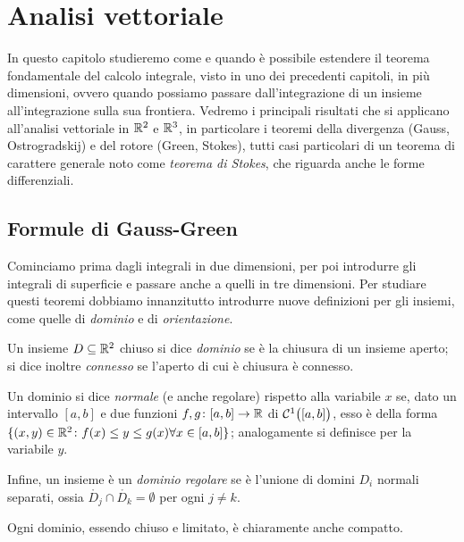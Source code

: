 \chapter{Analisi vettoriale}
In questo capitolo studieremo come e quando è possibile estendere il teorema fondamentale del calcolo integrale, visto in uno dei precedenti capitoli, in più dimensioni, ovvero quando possiamo passare dall'integrazione di un insieme all'integrazione sulla sua frontiera.
Vedremo i principali risultati che si applicano all'analisi vettoriale in $\mathbb{R}^2$ e $\mathbb{R}^3$, in particolare i teoremi della divergenza (Gauss, Ostrogradskij) e del rotore (Green, Stokes), tutti casi particolari di un teorema di carattere generale noto come \emph{teorema di Stokes}, che riguarda anche le forme differenziali.

\section{Formule di Gauss-Green}
Cominciamo prima dagli integrali in due dimensioni, per poi introdurre gli integrali di superficie e passare anche a quelli in tre dimensioni.
Per studiare questi teoremi dobbiamo innanzitutto introdurre nuove definizioni per gli insiemi, come quelle di \emph{dominio} e di \emph{orientazione}.
\begin{definizione} \label{d:dominio}
	Un insieme $D\subseteq\mathbb{R}^2$ chiuso si dice \emph{dominio} se è la chiusura di un insieme aperto; si dice inoltre \emph{connesso} se l'aperto di cui è chiusura è connesso.

	Un dominio si dice \emph{normale} (e anche regolare) rispetto alla variabile $x$ se, dato un intervallo $[a,b]$ e due funzioni $f,g\colon[a,b]\to\mathbb{R}$ di $\mathcal{C}^{{1}}\big([a,b]\big)$, esso è della forma $\{(x,y)\in\mathbb{R}^2\colon f(x)\leq y\leq g(x) \forall x\in[a,b]\}$; analogamente si definisce per la variabile $y$.

	Infine, un insieme è un \emph{dominio regolare} se è l'unione di domini $D_i$ normali separati, ossia $\mathring{D_j}\cap\mathring{D_k}=\emptyset$ per ogni $j\neq k$.
\end{definizione}
Ogni dominio, essendo chiuso e limitato, è chiaramente anche compatto.


